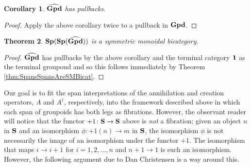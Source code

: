 \documentclass[11pt]{amsart}
\newtheorem{thm}{Theorem}[section]
\newtheorem{cor}[thm]{Corollary}
\theoremstyle{remark}
\theoremstyle{definition}
\begin{document}
\begin{cor}
$\bold{\widehat{Gpd}}$ has pullbacks.
\end{cor}
\begin{proof}
Apply the above corollary twice to a pullback in $\bold{Gpd}$.
\end{proof}
\begin{thm}
$\bold{Sp(Sp(\widehat{Gpd}))}$ is a symmetric monoidal bicategory.
\end{thm}
\begin{proof}
$\bold{\widehat{Gpd}}$ has pullbacks by the above corollary and the terminal category $\bold{1}$ as the terminal groupoud and so this follows immediately by Theorem \ref{thm:SpansSpansAreSMBicat}.
\end{proof}
Our goal is to fit the span interpretations of the annihilation and creation operators, $A$ and $A^\dagger$, respectively, into the framework described above in which each span of groupoids has both legs as fibrations. However, the observant reader will notice that the functor $+1 \colon \bold{S} \to \bold{S}$ above is \emph{not} a fibration; given an object $n$ in $\bold{S}$ and an isomorphism $\phi \colon +1(n) \to m$ in $\bold{S}$, the isomorphism $\phi$ is not necessarily the image of an isomorphism under the functor $+1$. The isomorphism that maps $i \to i+1$ for $i=1,2, \ldots, n$ and $n+1 \to 1$ is such an isomorphism. However, the following argument due to Dan Christensen \cite{DC} is a way around this.
\end{document}
